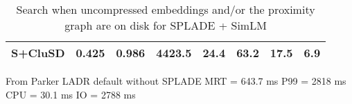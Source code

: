 {\begin{table}[htbp]
{\begin{tabular}{r |lll|ll|rr}
    S+CluSD& 0.425 & 0.986  & 4423.5& 24.4 & 63.2 & 17.5 & 6.9\\
                \hline\hline
                \end{tabular}  }
        \caption{Search when uncompressed embeddings and/or the proximity graph are on disk for SPLADE + SimLM}
\vspace*{-5mm}
        \label{tab:disktime}
\end{table}

From Parker
LADR default without SPLADE
MRT = 643.7 ms
P99 = 2818 ms
CPU = 30.1 ms
IO = 2788 ms
}

